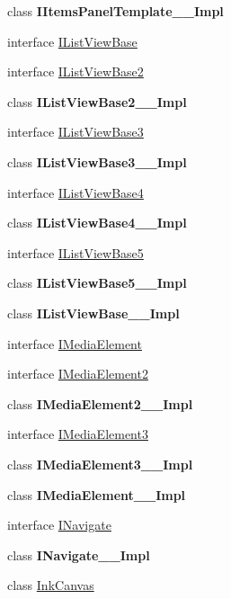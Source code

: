 \begin{DoxyCompactItemize}
\item 
class {\bfseries I\+Items\+Panel\+Template\+\_\+\+\_\+\+Impl}
\item 
interface \hyperlink{interface_windows_1_1_u_i_1_1_xaml_1_1_controls_1_1_i_list_view_base}{I\+List\+View\+Base}
\item 
interface \hyperlink{interface_windows_1_1_u_i_1_1_xaml_1_1_controls_1_1_i_list_view_base2}{I\+List\+View\+Base2}
\item 
class {\bfseries I\+List\+View\+Base2\+\_\+\+\_\+\+Impl}
\item 
interface \hyperlink{interface_windows_1_1_u_i_1_1_xaml_1_1_controls_1_1_i_list_view_base3}{I\+List\+View\+Base3}
\item 
class {\bfseries I\+List\+View\+Base3\+\_\+\+\_\+\+Impl}
\item 
interface \hyperlink{interface_windows_1_1_u_i_1_1_xaml_1_1_controls_1_1_i_list_view_base4}{I\+List\+View\+Base4}
\item 
class {\bfseries I\+List\+View\+Base4\+\_\+\+\_\+\+Impl}
\item 
interface \hyperlink{interface_windows_1_1_u_i_1_1_xaml_1_1_controls_1_1_i_list_view_base5}{I\+List\+View\+Base5}
\item 
class {\bfseries I\+List\+View\+Base5\+\_\+\+\_\+\+Impl}
\item 
class {\bfseries I\+List\+View\+Base\+\_\+\+\_\+\+Impl}
\item 
interface \hyperlink{interface_windows_1_1_u_i_1_1_xaml_1_1_controls_1_1_i_media_element}{I\+Media\+Element}
\item 
interface \hyperlink{interface_windows_1_1_u_i_1_1_xaml_1_1_controls_1_1_i_media_element2}{I\+Media\+Element2}
\item 
class {\bfseries I\+Media\+Element2\+\_\+\+\_\+\+Impl}
\item 
interface \hyperlink{interface_windows_1_1_u_i_1_1_xaml_1_1_controls_1_1_i_media_element3}{I\+Media\+Element3}
\item 
class {\bfseries I\+Media\+Element3\+\_\+\+\_\+\+Impl}
\item 
class {\bfseries I\+Media\+Element\+\_\+\+\_\+\+Impl}
\item 
interface \hyperlink{interface_windows_1_1_u_i_1_1_xaml_1_1_controls_1_1_i_navigate}{I\+Navigate}
\item 
class {\bfseries I\+Navigate\+\_\+\+\_\+\+Impl}
\item 
class \hyperlink{class_windows_1_1_u_i_1_1_xaml_1_1_controls_1_1_ink_canvas}{Ink\+Canvas}
\item 

\end{DoxyCompactItemize}
